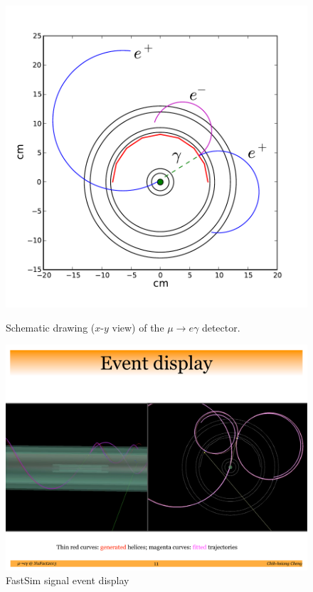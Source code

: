 \begin{figure}[htbp]
\centering
\begin{minipage}[c]{0.47\textwidth}
\centering
\includegraphics[width=\textwidth]{Figures/muegamma-schematic.pdf}
\caption{Schematic drawing ($x$-$y$ view) of the $\mu\to e\gamma$ detector.}
\label{fig:detscheme}
\end{minipage}
\quad
\begin{minipage}[c]{0.47\textwidth}
\centering
\includegraphics[width=\textwidth]{Figures/event_display.pdf}
\caption{FastSim signal event display}
\label{fig:evtdisplay}
\end{minipage}
\end{figure}

